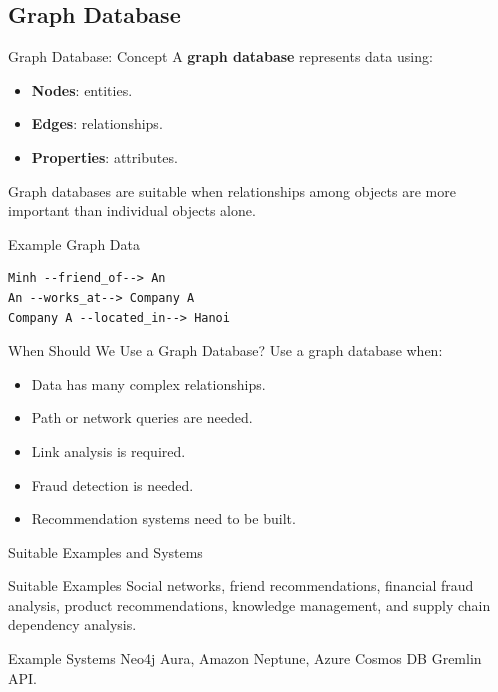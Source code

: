 \documentclass[aspectratio=169,11pt]{beamer}
\newcommand{\keyword}[1]{\textcolor{accent}{\textbf{#1}}}
\newcommand{\kw}[1]{\keyword{#1}}
\newcommand{\smallitem}{\setlength{\itemsep}{2pt}\setlength{\parskip}{0pt}}
\begin{document}
\subsection{Graph Database}

\begin{frame}{Graph Database: Concept}
A \kw{graph database} represents data using:
\begin{itemize}
  \smallitem
  \item \kw{Nodes}: entities.
  \item \kw{Edges}: relationships.
  \item \kw{Properties}: attributes.
\end{itemize}

Graph databases are suitable when relationships among objects are more important than individual objects alone.
\end{frame}

\begin{frame}[fragile]{Example Graph Data}
\small
\begin{verbatim}
Minh --friend_of--> An
An --works_at--> Company A
Company A --located_in--> Hanoi
\end{verbatim}
\end{frame}

\begin{frame}{When Should We Use a Graph Database?}
Use a graph database when:
\begin{itemize}
  \smallitem
  \item Data has many complex relationships.
  \item Path or network queries are needed.
  \item Link analysis is required.
  \item Fraud detection is needed.
  \item Recommendation systems need to be built.
\end{itemize}
\end{frame}

\begin{frame}{Suitable Examples and Systems}
\begin{block}{Suitable Examples}
Social networks, friend recommendations, financial fraud analysis, product recommendations, knowledge management, and supply chain dependency analysis.
\end{block}

\begin{block}{Example Systems}
Neo4j Aura, Amazon Neptune, Azure Cosmos DB Gremlin API.
\end{block}
\end{frame}
\end{document}
